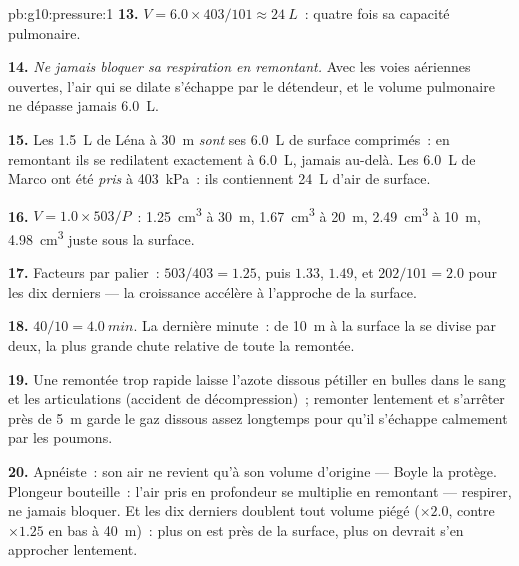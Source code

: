 \begin{solution}{pb:g10:pressure:1}
\textbf{13.} $V = 6.0 \times 403/101 \approx \qty{24}{L}$~: quatre
fois sa capacité pulmonaire.

\textbf{14.} \emph{Ne jamais bloquer sa respiration en remontant.} Avec
les voies aériennes ouvertes, l'air qui se dilate s'échappe par le
détendeur, et le volume pulmonaire ne dépasse jamais \qty{6.0}{L}.

\textbf{15.} Les \qty{1.5}{L} de Léna à \qty{30}{m} \emph{sont} ses
\qty{6.0}{L} de surface comprimés~: en remontant ils se redilatent
exactement à \qty{6.0}{L}, jamais au-delà. Les \qty{6.0}{L} de Marco
ont été \emph{pris} à \qty{403}{kPa}~: ils contiennent \qty{24}{L}
d'air de surface.

\textbf{16.} $V = 1.0 \times 503/P$~: \qty{1.25}{cm^3} à \qty{30}{m},
\qty{1.67}{cm^3} à \qty{20}{m}, \qty{2.49}{cm^3} à \qty{10}{m},
\qty{4.98}{cm^3} juste sous la surface.

\textbf{17.} Facteurs par palier~: $503/403 = 1.25$, puis $1.33$,
$1.49$, et $202/101 = 2.0$ pour les dix derniers
 --- la croissance accélère à l'approche de la
surface.

\textbf{18.} $40/10 = \qty{4.0}{min}$. La dernière minute~: de
\qty{10}{m} à la surface la  se divise par
deux, la plus grande chute relative de toute la remontée.

\textbf{19.} Une remontée trop rapide laisse l'azote dissous pétiller
en bulles dans le sang et les articulations (accident de
décompression)~; remonter lentement et s'arrêter près de \qty{5}{m}
garde le gaz dissous assez longtemps pour qu'il s'échappe calmement
par les poumons.

\textbf{20.} Apnéiste~: son air ne revient qu'à son volume d'origine
--- Boyle la protège. Plongeur bouteille~: l'air pris en profondeur se
multiplie en remontant --- respirer, ne jamais bloquer. Et les dix
derniers  doublent tout volume piégé ($\times 2.0$,
contre $\times 1.25$ en bas à \qty{40}{m})~: plus on est près de la
surface, plus on devrait s'en approcher lentement.
\end{solution}
